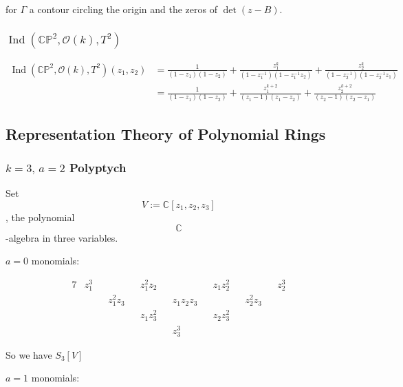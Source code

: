 \documentclass{article}
\newcommand{\PP}{\mathbb{P}}
\newcommand{\CC}{\mathbb{C}}
\newcommand{\mcO}{\mathcal{O}}
\DeclareMathOperator{\Ind}{Ind}
\begin{document}
	for $\Gamma$ a contour circling the origin and the zeros of $\det(z - B)$.
	
	\subsubsection{$\Ind(\CC\PP^{2}, \mcO(k), T^{2})$}
	
	\begin{equation*}
		\begin{split}
			\Ind(\CC\PP^{2}, \mcO(k), T^{2})(z_{1}, z_{2}) &= \frac{1}{(1 - z_{1})(1 - z_{2})} + \frac{z_{1}^{k}}{(1 - z_{1}^{-1})(1 - z_{1}^{-1}z_{2})} + \frac{z_{2}^{k}}{(1 - z_{2}^{-1})(1 - z_{2}^{-1}z_{1})} \\
			&= \frac{1}{(1 - z_{1})(1 - z_{2})} + \frac{z_{1}^{k+2}}{(z_{1} - 1)(z_{1} - z_{2})} + \frac{z_{2}^{k+2}}{(z_{2} - 1)(z_{2} - z_{1})}
		\end{split}
	\end{equation*}
	
	
		
	
	\subsection{Representation Theory of Polynomial Rings}
	
	\subsubsection{$k = 3,\, a = 2$ Polyptych}
	
	Set $$ V := \CC[z_{1}, z_{2}, z_{3}] $$, the polynomial $$ \CC $$-algebra in three variables.
	
	$a = 0$ monomials:
	
	\begin{alignat*}{7}
		& z_{1}^{3} && && z_{1}^{2}z_{2} && && z_{1}z_{2}^{2} && && z_{2}^{3} \\
		& && z_{1}^{2}z_{3} && && z_{1}z_{2}z_{3} && && z_{2}^{2}z_{3} && \\
		& && && z_{1}z_{3}^{2} && && z_{2}z_{3}^{2} && &&  \\
		& && && && z_{3}^{3} && && &&
	\end{alignat*}
	
	
	So we have $S_{3}[V]$
	
	$a = 1$ monomials:
	
\end{document}
